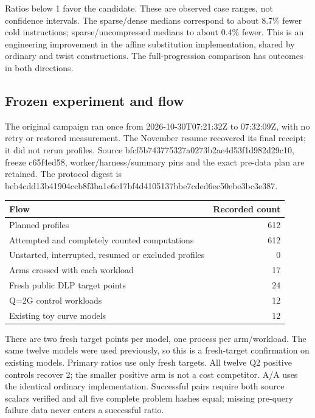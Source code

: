 \documentclass[
  10pt,
]{article}
\begin{document}
Ratios below 1 favor the candidate. These are observed case ranges, not
confidence intervals. The sparse/dense medians correspond to about 8.7\%
fewer cold instructions; sparse/uncompressed medians to about 0.4\%
fewer. This is an engineering improvement in the affine substitution
implementation, shared by ordinary and twist constructions. The
full-progression comparison has outcomes in both directions.

\subsection{Frozen experiment and
flow}\label{frozen-experiment-and-flow}

The original campaign ran once from 2026-10-30T07:21:32Z to 07:32:09Z,
with no retry or restored measurement. The November resume recovered its
final receipt; it did not rerun profiles. Source
bfcf5b74\allowbreak{}3775327a\allowbreak{}0273b2ae\allowbreak{}4d53f1d9\allowbreak{}82d29c10, freeze c65f4ed58,
worker/harness/summary pins and the exact pre-data plan are retained.
The protocol digest is
beb4cdd1\allowbreak{}3b41904c\allowbreak{}cb8f3ba1\allowbreak{}e6e17bf4\allowbreak{}d4105137\allowbreak{}bbe7cded\allowbreak{}6ec50ebe\allowbreak{}3bc3e387.

\begin{longtable}[]{@{}lr@{}}
\toprule\noalign{}
Flow & Recorded count \\
\midrule\noalign{}
\endhead
\bottomrule\noalign{}
\endlastfoot
Planned profiles & 612 \\
Attempted and completely counted computations & 612 \\
Unstarted, interrupted, resumed or excluded profiles & 0 \\
Arms crossed with each workload & 17 \\
Fresh public DLP target points & 24 \\
Q=2G control workloads & 12 \\
Existing toy curve models & 12 \\
\end{longtable}

There are two fresh target points per model, one process per
arm/workload. The same twelve models were used previously, so this is a
fresh-target confirmation on existing models. Primary ratios use only
fresh targets. All twelve Q2 positive controls recover 2; the smaller
positive arm is not a cost competitor. A/A uses the identical ordinary
implementation. Successful pairs require both source scalars verified
and all five complete problem hashes equal; missing pre-query failure
data never enters a successful ratio.
\end{document}
